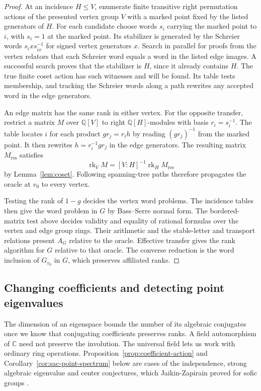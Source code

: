\documentclass[11pt,a4paper,reqno]{amsart}
\numberwithin{equation}{section}
\theoremstyle{remark}
\newcommand{\C}{\mathbb C}
\newcommand{\Q}{\mathbb Q}
\newcommand{\rk}{\operatorname{rk}}
\begin{document}
\begin{proof}
At an incidence \(H\leq V\), enumerate finite transitive right permutation actions of the presented vertex group \(V\) with a marked point fixed by the listed generators of \(H\). For each candidate choose words \(s_i\) carrying the marked point to \(i\), with \(s_i=1\) at the marked point. Its stabilizer is generated by the Schreier words \(s_i x s_{ix}^{-1}\) for signed vertex generators \(x\). Search in parallel for proofs from the vertex relators that each Schreier word equals a word in the listed edge images. A successful search proves that the stabilizer is \(H\), since it already contains \(H\). The true finite coset action has such witnesses and will be found. Its table tests membership, and tracking the Schreier words along a path rewrites any accepted word in the edge generators.

An edge matrix has the same rank in either vertex. For the opposite transfer, restrict a matrix \(M\) over \(\Q[V]\) to right \(\Q[H]\)-modules with basis \(r_i=s_i^{-1}\). The table locates \(i\) for each product \(gr_j=r_i h\) by reading \((gr_j)^{-1}\) from the marked point. It then rewrites \(h=r_i^{-1}gr_j\) in the edge generators. The resulting matrix \(M_{\mathrm{res}}\) satisfies
\[
                  \rk_V M=[V:H]^{-1}\rk_H M_{\mathrm{res}}
\]
by Lemma~\ref{lem:coset}. Following spanning-tree paths therefore propagates the oracle at \(v_0\) to every vertex.

Testing the rank of \(1-g\) decides the vertex word problems. The incidence tables then give the word problem in \(G\) by Bass--Serre normal form. The bordered-matrix test above decides validity and equality of rational formulas over the vertex and edge group rings. Their arithmetic and the stable-letter and transport relations present \(A_G\) relative to the oracle. Effective transfer gives the rank algorithm for \(G\) relative to that oracle. The converse reduction is the word inclusion of \(G_{v_0}\) in \(G\), which preserves affiliated ranks.
\end{proof}

\subsection{Changing coefficients and detecting point eigenvalues}

The dimension of an eigenspace bounds the number of its algebraic conjugates once we know that conjugating coefficients preserves ranks. A field automorphism of \(\C\) need not preserve the involution. The universal field lets us work with ordinary ring operations. Proposition~\ref{prop:coefficient-action} and Corollary~\ref{cor:sac-point-spectrum} below are cases of the independence, strong algebraic eigenvalue and center conjectures, which Jaikin-Zapirain proved for sofic groups \cite[Corollaries~1.5--1.7]{Jaikin}.
\end{document}
